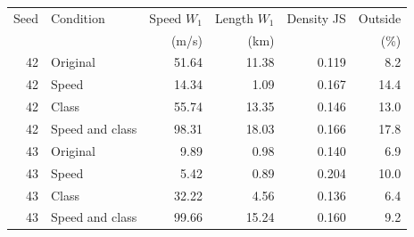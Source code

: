 \begin{center}\small\begin{tabular}{rlrrrr}\toprule
Seed & Condition & Speed $W_1$ & Length $W_1$ & Density JS & Outside \\
 & & (m/s) & (km) & & (\%)\\\midrule
42 & Original & 51.64 & 11.38 & 0.119 & 8.2\\
42 & Speed & 14.34 & 1.09 & 0.167 & 14.4\\
42 & Class & 55.74 & 13.35 & 0.146 & 13.0\\
42 & Speed and class & 98.31 & 18.03 & 0.166 & 17.8\\
43 & Original & 9.89 & 0.98 & 0.140 & 6.9\\
43 & Speed & 5.42 & 0.89 & 0.204 & 10.0\\
43 & Class & 32.22 & 4.56 & 0.136 & 6.4\\
43 & Speed and class & 99.66 & 15.24 & 0.160 & 9.2\\
\bottomrule\end{tabular}\end{center}
